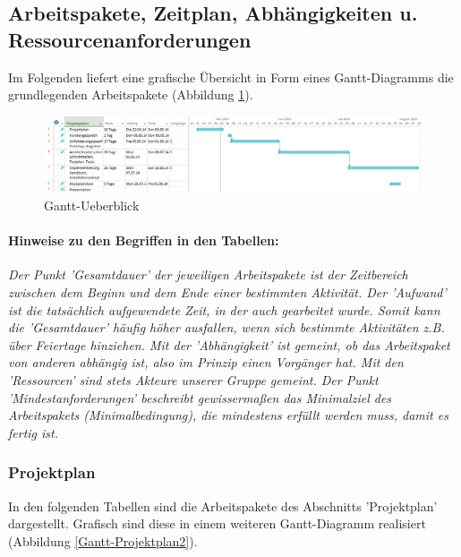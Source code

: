 \documentclass[fontsize=12pt,paper=a4,twoside]{scrartcl}
\begin{document}
\subsection{Arbeitspakete, Zeitplan, Abhängigkeiten u. Ressourcenanforderungen}\label{aps}

Im Folgenden liefert eine grafische Übersicht in Form eines Gantt-Diagramms die grundlegenden Arbeitspakete (Abbildung \ref{Gantt-Ueberblick}).\\

\begin{figure}[!h]
\includegraphics[angle = 90, scale=0.4]{gantt_ueberblick.jpg}
\caption{Gantt-Ueberblick}
\label{Gantt-Ueberblick}
\end{figure}

\newpage

\paragraph{Hinweise zu den Begriffen in den Tabellen:} \textit{Der Punkt 'Gesamtdauer' der jeweiligen Arbeitspakete ist der Zeitbereich zwischen dem Beginn und dem Ende einer bestimmten Aktivität. Der 'Aufwand' ist die tatsächlich aufgewendete Zeit, in der auch gearbeitet wurde. Somit kann die 'Gesamtdauer' häufig höher ausfallen, wenn sich bestimmte Aktivitäten z.B. über Feiertage hinziehen. Mit der 'Abhängigkeit' ist gemeint, ob das Arbeitspaket von anderen abhängig ist, also im Prinzip einen Vorgänger hat. Mit den 'Ressourcen' sind stets Akteure unserer Gruppe gemeint. Der Punkt 'Mindestanforderungen' beschreibt gewissermaßen das Minimalziel des Arbeitspakets (Minimalbedingung), die mindestens erfüllt werden muss, damit es fertig ist.}\\

\subsubsection{Projektplan}\label{aps}

In den folgenden Tabellen sind die Arbeitspakete des Abschnitts 'Projektplan' dargestellt. Grafisch sind diese in einem weiteren Gantt-Diagramm realisiert (Abbildung \ref{Gantt-Projektplan2}). \\
\end{document}
